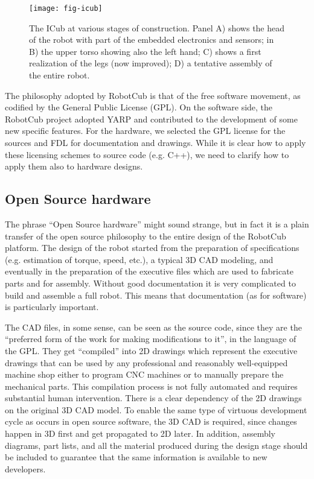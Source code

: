 \begin{figure}[tbp]
\centerline{
\texttt{[image: fig-icub]}
}
\caption{The ICub at various stages of construction. Panel A) shows the head
of the robot with part of the embedded electronics and sensors; in B) the upper
torso showing also the left hand; C) shows a first realization of the legs (now
improved); D) a tentative assembly of the entire robot.} 
\label{fig:icub}
\end{figure}


The philosophy adopted by RobotCub is that of
the free software movement,
as codified by the General Public License (GPL). 
On the software side, the RobotCub project adopted YARP and contributed
to the development of some new specific features. For the hardware, we
selected the GPL license for the sources and FDL for documentation
and drawings. While it is clear how to apply these licensing
schemes to source code (e.g. C++), we need to clarify how to
apply them also to hardware designs.

\subsection{Open Source hardware}
The phrase ``Open Source hardware'' might sound strange,
 but in fact it is a 
plain transfer of the open source philosophy to the entire
design of the RobotCub platform.
%
%
The design of the robot started from 
the preparation of specifications (e.g. estimation of torque, speed, etc.),
a typical 3D CAD modeling, and eventually in the preparation
of the executive files which are used to fabricate parts and for assembly. 
Without good documentation it is very complicated to build and assemble 
a full robot. This means that documentation (as for software) is particularly 
important.

The CAD files, in some sense, can be seen as the source code, since
they are the ``preferred form of the work for making modifications
to it'', in the language of the GPL.
%
They get ``compiled''
into 2D drawings which represent the executive drawings that can be used by any
professional and reasonably well-equipped machine shop either to program CNC machines 
or to manually prepare the mechanical parts. This compilation process is not fully 
automated and requires substantial human intervention. There is a clear dependency 
of the 2D drawings on the original 3D CAD model. To enable the same type of virtuous 
development cycle as occurs in open source software, the 3D CAD is required, since changes happen 
in 3D first and get propagated to 2D later. In addition, assembly diagrams, part 
lists, and all the material produced during the design stage should be included 
to guarantee that the same information is available to new developers.


